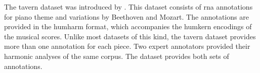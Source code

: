 

The \gls{tavern} dataset was introduced by
\textcite{devaney2015theme}. This dataset consists of
\gls{rna} annotations for piano theme and variations by
Beethoven and Mozart. The annotations are provided in the
\gls{humharm} format, which accompanies the \gls{humkern}
encodings of the musical scores. Unlike most datasets of
this kind, the \gls{tavern} dataset provides more than one
annotation for each piece. Two expert annotators provided
their harmonic analyses of the same corpus. The dataset
provides both sets of annotations.
